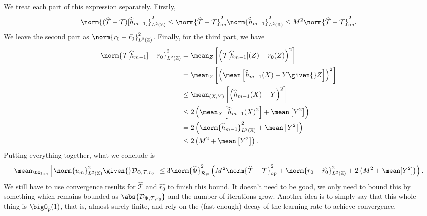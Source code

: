 We treat each part of this expression separately.
Firstly,
\begin{align*}
    \norm{ ( \hat{ \mathcal{T} } - \mathcal{T} ) [ \hat{ h }_{ m-1 } ] }_{ L^2 ( \mathbb{Z} ) }^2
    \leq \norm{ \hat{ \mathcal{T} } - \mathcal{T} }_{ \mathrm{op} }^2 \norm{ \hat{ h }_{ m-1 } }_{ L^2 ( \mathbb{X} ) }^2
    \leq M^2 \norm{ \hat{ \mathcal{T} } - \mathcal{T} }_{ \mathrm{op} }^2
.\end{align*}
We leave the second part as $ \norm{ r_{ 0 } - \hat{ r_{ 0 } } }_{ L^{ 2 } ( \mathbb{Z} ) }^2 $.
Finally, for the third part, we have
\begin{align*}
    \norm{ \mathcal{T} [ \hat{ h }_{ m-1 } ] - r_{ 0 } }_{ L^2 ( \mathbb{Z} ) }^2
    &= \mean_{ Z } \left[
        \left(
            \mathcal{T} [ \hat{ h }_{ m-1 } ] ( Z ) - r_{ 0 } ( Z )
        \right)^2
    \right] \\
    &= \mean_{ Z } \left[
        \left(
            \mean \left[ \hat{ h }_{ m-1 } ( X ) - Y \given{} Z \right]
        \right)^2
    \right] \\
    &\leq \mean_{ ( X, Y ) } \left[
        \left(
            \hat{ h }_{ m-1 } ( X ) - Y
        \right)^2
    \right] \\
    &\leq 2 \left(
        \mean_{ X } \left[ \hat{ h }_{ m-1 } ( X )^2 \right]
        + \mean \left[ Y^2 \right]
    \right) \\
    &= 2 \left(
        \norm{ \hat{ h }_{ m-1 } }_{ L^2 ( \mathbb{X} ) }^2
        + \mean \left[ Y^2 \right]
    \right) \\
    &\leq 2 \left( M^2 + \mean \left[ Y^2 \right] \right)
.\end{align*}
Putting everything together, what we conclude is
\begin{align*}
    \mean_{ \bz_{ 1:m } } \left[
        \norm{ u_{ m } }_{ L^2 ( \mathbb{X} ) }^2 \given{} \dataoff
    \right]
    \leq
    3 \norm{ \hat{ \Phi } }_{ \rkhsw }^2 \left(
        M^2 \norm{ \hat{ \mathcal{T} } - \mathcal{T} }_{ \mathrm{op} }^2
        + \norm{ r_{ 0 } - \hat{ r_{ 0 } } }_{ L^2 ( \mathbb{Z} ) }^2
        + 2 \left( M^2 + \mean [ Y^2 ] \right)
    \right)
.\end{align*}
{\color{red} We still have to use convergence results for $ \hat{ \mathcal{T} } $ and $ \hat{ r_{ 0 } } $ to finish this bound.
It doesn't need to be good, we only need to bound this by something which remains bounded as $ \abs{ \dataoff } $ and the number of iterations grow.
Another idea is to simply say that this whole thing is $ \bigO_{ p } ( 1 ) $, that is, almost surely finite, and rely on the (fast enough) decay of the learning rate to achieve convergence.}

